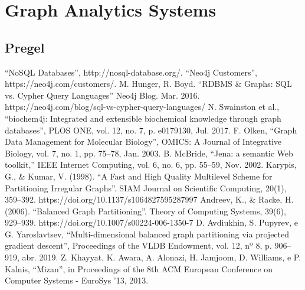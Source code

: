 \documentclass[conference]{IEEEtran}
\begin{document}
\section{Graph Analytics Systems}
\subsection{Pregel}

\begin{thebibliography}{00}
 ``NoSQL Databases'', http://nosql-database.org/.
 ``Neo4j Customers'', https://neo4j.com/customers/.
 M. Hunger, R. Boyd. ``RDBMS \& Graphs: SQL vs. Cypher Query Languages'' Neo4j Blog. Mar. 2016. https://neo4j.com/blog/sql-vs-cypher-query-languages/
 N. Swainston et al., ``biochem4j: Integrated and extensible biochemical knowledge through graph databases'', PLOS ONE, vol. 12, no. 7, p. e0179130, Jul. 2017. 
 F. Olken, ``Graph Data Management for Molecular Biology'', OMICS: A Journal of Integrative Biology, vol. 7, no. 1, pp. 75–78, Jan. 2003.
 B. McBride, ``Jena: a semantic Web toolkit,” IEEE Internet Computing, vol. 6, no. 6, pp. 55–59, Nov. 2002.
 Karypis, G., \& Kumar, V. (1998). ``A Fast and High Quality Multilevel Scheme for Partitioning Irregular Graphs''. SIAM Journal on Scientific Computing, 20(1), 359–392. https://doi.org/10.1137/s1064827595287997
 Andreev, K., \& Racke, H. (2006). ``Balanced Graph Partitioning''. Theory of Computing Systems, 39(6), 929–939. https://doi.org/10.1007/s00224-006-1350-7
 D. Avdiukhin, S. Pupyrev, e G. Yaroslavtsev, ``Multi-dimensional balanced graph partitioning via projected gradient descent'', Proceedings of the VLDB Endowment, vol. 12, nº 8, p. 906–919, abr. 2019.
 Z. Khayyat, K. Awara, A. Alonazi, H. Jamjoom, D. Williams, e P. Kalnis, ``Mizan'', in Proceedings of the 8th ACM European Conference on Computer Systems - EuroSys ’13, 2013.
\end{thebibliography}
\end{document}
